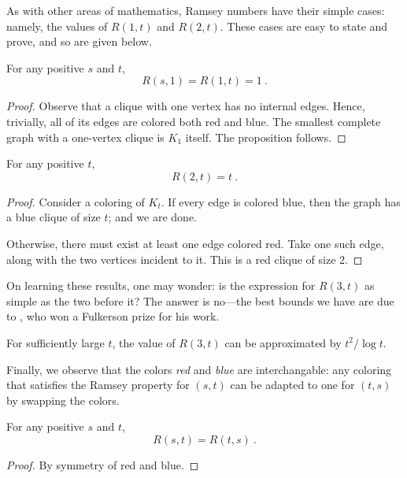 \documentclass{article}
\begin{document}
As with other areas of mathematics, Ramsey numbers have their simple cases: namely, the values of $R(1,t)$ and $R(2,t)$. These cases are easy to state and prove, and so are given below.

\begin{Proposition}
    For any positive $s$ and $t$,
    \[ R(s,1) = R(1,t) = 1 \ . \]
\end{Proposition}

\begin{proof}
    Observe that a clique with one vertex has no internal edges. Hence, trivially, all of its edges are colored both red and blue. The smallest complete graph with a one-vertex clique is $K_1$ itself. The proposition follows.
\end{proof}

\begin{Proposition}
    For any positive $t$,
    \[ R(2,t) = t \ . \]
\end{Proposition}

\begin{proof}
    Consider a coloring of $K_t$. If every edge is colored blue, then the graph has a blue clique of size $t$; and we are done.

    Otherwise, there must exist at least one edge colored red. Take one such edge, along with the two vertices incident to it. This is a red clique of size 2.
\end{proof}

On learning these results, one may wonder: is the expression for $R(3,t)$ as simple as the two before it? The answer is no---the best bounds we have are due to \citet{RSA:RSA3240070302}, who won a Fulkerson prize for his work.

\begin{Theorem} \label{kims_theorem}
    For sufficiently large $t$, the value of $R(3,t)$ can be approximated by $t^2/\log t$.
\end{Theorem}

Finally, we observe that the colors \emph{red} and \emph{blue} are interchangable: any coloring that satisfies the Ramsey property for $(s,t)$ can be adapted to one for $(t,s)$ by swapping the colors.

\begin{Proposition}
    For any positive $s$ and $t$,
    \[ R(s,t) = R(t,s) \ . \]
\end{Proposition}

\begin{proof}
    By symmetry of red and blue.
\end{proof}
\end{document}
